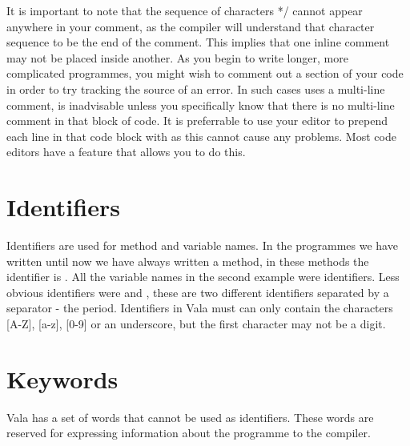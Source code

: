 It is important to note that the sequence of characters */ cannot appear anywhere in your comment, as the compiler will understand that character sequence to be the end of the comment. This implies that one inline comment may not be placed inside another. As you begin to write longer, more complicated programmes, you might wish to comment out a section of your code in order to try tracking the source of an error. In such cases uses a multi-line comment, is inadvisable unless you specifically know that there is no multi-line comment in that block of code. It is preferrable to use your editor to prepend each line in that code block with \inlinecode{//} as this cannot cause any problems. Most code editors have a feature that allows you to do this.


\section{Identifiers}
Identifiers are used for method and variable names. In the programmes we have written until now we have always written a  method, in these methods the identifier is . All the variable names in the second example were identifiers. Less obvious identifiers were  and , these are two different identifiers separated by a separator - the period. Identifiers in Vala must can only contain the characters [A-Z], [a-z], [0-9] or an underscore, but the first character may not be a digit.

\section{Keywords}
Vala has a set of words that cannot be used as identifiers. These words are reserved for expressing information about the programme to the compiler.

